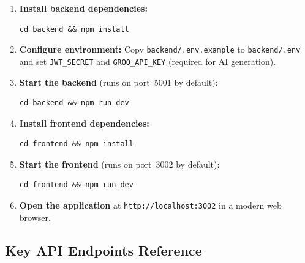 \begin{enumerate}
  \item \textbf{Install backend dependencies:}
\begin{lstlisting}[language={}]
cd backend && npm install
\end{lstlisting}

  \item \textbf{Configure environment:} Copy \texttt{backend/.env.example}
  to \texttt{backend/.env} and set \texttt{JWT\_SECRET} and
  \texttt{GROQ\_API\_KEY} (required for AI generation).

  \item \textbf{Start the backend} (runs on port~5001 by default):
\begin{lstlisting}[language={}]
cd backend && npm run dev
\end{lstlisting}

  \item \textbf{Install frontend dependencies:}
\begin{lstlisting}[language={}]
cd frontend && npm install
\end{lstlisting}

  \item \textbf{Start the frontend} (runs on port~3002 by default):
\begin{lstlisting}[language={}]
cd frontend && npm run dev
\end{lstlisting}

  \item \textbf{Open the application} at
  \texttt{http://localhost:3002} in a modern web browser.
\end{enumerate}

\subsection{Key API Endpoints Reference}

